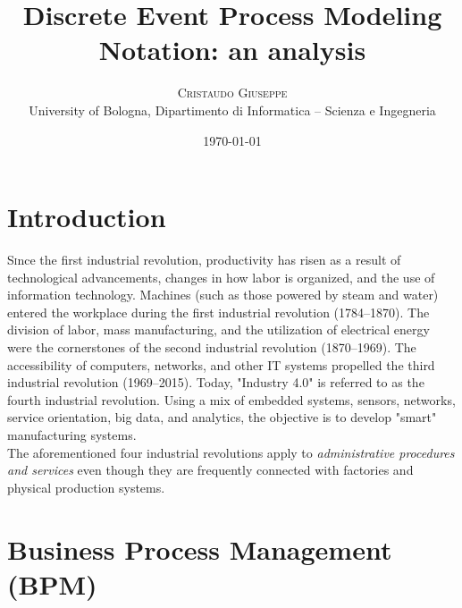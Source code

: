\documentclass{article}
\title{Discrete Event Process Modeling Notation: an analysis} %
\author{%
\textsc{Cristaudo Giuseppe} \\%
\normalsize University of Bologna, Dipartimento di Informatica – Scienza e Ingegneria \\ %
}
\date{\today} %
\begin{document}
\maketitle


\section{Introduction}

\lettrine[nindent=0em,lines=3]{S}ince the first industrial revolution, productivity has risen as a result of technological advancements, changes in how labor is organized, and the use of information technology. Machines (such as those powered by steam and water) entered the workplace during the first industrial revolution (1784–1870). The division of labor, mass manufacturing, and the utilization of electrical energy were the cornerstones of the second industrial revolution (1870–1969). The accessibility of computers, networks, and other IT systems propelled the third industrial revolution (1969–2015). Today, "Industry 4.0" is referred to as the fourth industrial revolution. Using a mix of embedded systems, sensors, networks, service orientation, big data, and analytics, the objective is to develop "smart" manufacturing systems. \\
The aforementioned four industrial revolutions apply to {\em administrative procedures and services} even though they are frequently connected with factories and physical production systems.


\section{Business Process Management (BPM)}
\end{document}

